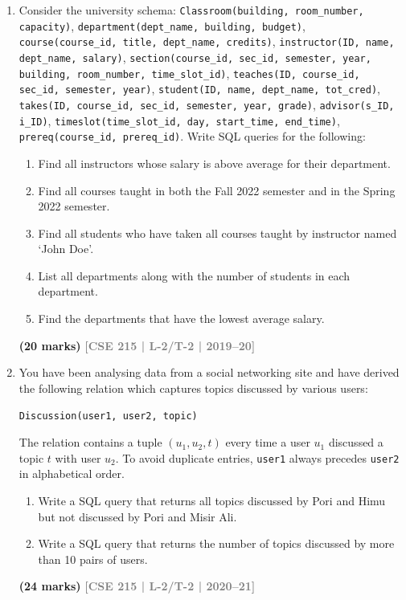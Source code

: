 \documentclass[12pt,a3paper]{article}
\newcommand{\yr}[1]{\hfill\textcolor{gray}{\small\textbf{[#1]}}}
\newcommand{\mk}[1]{\textcolor{orange!70!black}{\small\textbf{(#1 marks)}}}
\begin{document}
\begin{enumerate}
\begin{center}
\end{center}
\mk{10} \yr{CSE 215 | L-2/T-2 | 2018--19}


\item Consider the university schema: \texttt{Classroom(building, room\_number, capacity)}, \texttt{department(dept\_name, building, budget)}, \texttt{course(course\_id, title, dept\_name, credits)}, \texttt{instructor(ID, name, dept\_name, salary)}, \texttt{section(course\_id, sec\_id, semester, year, building, room\_number, time\_slot\_id)}, \texttt{teaches(ID, course\_id, sec\_id, semester, year)}, \texttt{student(ID, name, dept\_name, tot\_cred)}, \texttt{takes(ID, course\_id, sec\_id, semester, year, grade)}, \texttt{advisor(s\_ID, i\_ID)}, \texttt{timeslot(time\_slot\_id, day, start\_time, end\_time)}, \texttt{prereq(course\_id, prereq\_id)}. Write SQL queries for the following:
\begin{enumerate}
  \item Find all instructors whose salary is above average for their department.
  \item Find all courses taught in both the Fall 2022 semester and in the Spring 2022 semester.
  \item Find all students who have taken all courses taught by instructor named `John Doe'.
  \item List all departments along with the number of students in each department.
  \item Find the departments that have the lowest average salary.
\end{enumerate}
\mk{20} \yr{CSE 215 | L-2/T-2 | 2019--20}

\item You have been analysing data from a social networking site and have derived the following relation which captures topics discussed by various users:
\begin{center}
\texttt{Discussion(user1, user2, topic)}
\end{center}
The relation contains a tuple $(u_1, u_2, t)$ every time a user $u_1$ discussed a topic $t$ with user $u_2$. To avoid duplicate entries, \texttt{user1} always precedes \texttt{user2} in alphabetical order.
\begin{enumerate}
  \item Write a SQL query that returns all topics discussed by Pori and Himu but not discussed by Pori and Misir Ali.
  \item Write a SQL query that returns the number of topics discussed by more than 10 pairs of users.
\end{enumerate}
\mk{24} \yr{CSE 215 | L-2/T-2 | 2020--21}


\end{enumerate}
\end{document}
